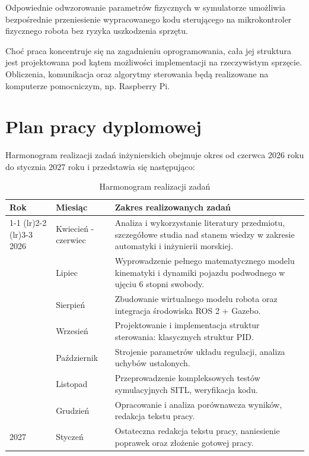 Odpowiednie odwzorowanie parametrów fizycznych w symulatorze umożliwia bezpośrednie przeniesienie wypracowanego kodu sterującego na mikrokontroler fizycznego robota bez ryzyka uszkodzenia sprzętu.

Choć praca koncentruje się na zagadnieniu oprogramowania, cała jej struktura jest projektowana pod kątem możliwości implementacji na rzeczywistym sprzęcie. Obliczenia, komunikacja oraz algorytmy sterowania będą realizowane na komputerze pomocniczym, np. Raspberry Pi.

\section{Plan pracy dyplomowej}
Harmonogram realizacji zadań inżynierskich obejmuje okres od czerwca 2026 roku do stycznia 2027 roku i przedstawia się następująco:

\newpage

\begin{table}[hbtp]
    \centering
    \renewcommand{\arraystretch}{1.5} %
    \caption{Harmonogram realizacji zadań}
    \label{tab:harmonogram}
    \vspace{0.5em}
    \begin{tabular}{llp{10cm}}
        \toprule
        \textbf{Rok} & \textbf{Miesiąc} & \textbf{Zakres realizowanych zadań} \\
        \cmidrule(lr){1-1} \cmidrule(lr){2-2} \cmidrule(lr){3-3} %
        2026 & Kwiecień - czerwiec   & Analiza i wykorzystanie literatury przedmiotu, szczegółowe studia nad stanem wiedzy w zakresie automatyki i inżynierii morskiej. \\
             & Lipiec     & Wyprowadzenie pełnego matematycznego modelu kinematyki i dynamiki pojazdu podwodnego w ujęciu 6 stopni swobody. \\
             & Sierpień   & Zbudowanie wirtualnego modelu robota oraz integracja środowiska ROS 2 + Gazebo. \\
             & Wrzesień   & Projektowanie i implementacja struktur sterowania: klasycznych struktur PID. \\
             & Październik & Strojenie parametrów układu regulacji, analiza uchybów ustalonych. \\
             & Listopad   & Przeprowadzenie kompleksowych testów symulacyjnych SITL, weryfikacja kodu. \\
             & Grudzień   & Opracowanie i analiza porównawcza wyników, redakcja tekstu pracy. \\
        \midrule %
        2027 & Styczeń    & Ostateczna redakcja tekstu pracy, naniesienie poprawek oraz złożenie gotowej pracy. \\
        \bottomrule
    \end{tabular}
\end{table}

